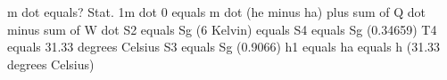 m dot equals?  
Stat. 1m dot  
0 equals m dot (he minus ha) plus sum of Q dot minus sum of W dot  
S2 equals Sg (6 Kelvin) equals  
S4 equals Sg (0.34659)  
T4 equals 31.33 degrees Celsius  
S3 equals Sg (0.9066)  
h1 equals ha equals h (31.33 degrees Celsius)